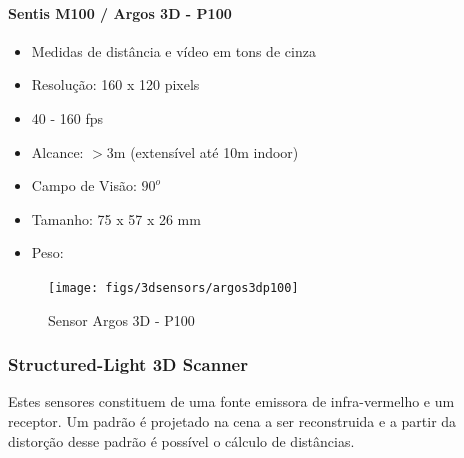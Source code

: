 \paragraph{Sentis M100 / Argos 3D - P100}

\begin{itemize}
  \item Medidas de distância e vídeo em tons de cinza
  \item Resolução: 160 x 120 pixels
  \item 40 - 160 fps
  \item Alcance: $>$3m  (extensível até 10m indoor)
  \item Campo de Visão: $90^o$
  \item Tamanho: 75 x 57 x 26 mm
  \item Peso:
\end{itemize}

\begin{figure}[h!]
   \centering
   \texttt{[image: figs/3dsensors/argos3dp100]}
   \caption{Sensor Argos 3D - P100}
   \label{fig::forecast}
\end{figure}

\subsubsection{Structured-Light 3D Scanner}



Estes sensores constituem de uma fonte emissora de infra-vermelho e um receptor.
Um padrão é projetado na cena a ser reconstruida e a partir da distorção desse
padrão é possível o cálculo de distâncias. 



